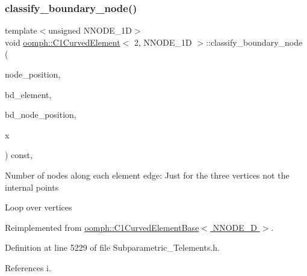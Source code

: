 \subsubsection{\texorpdfstring{classify\+\_\+boundary\+\_\+node()}{classify\_boundary\_node()}}
{\footnotesize\ttfamily template$<$unsigned N\+N\+O\+D\+E\+\_\+1D$>$ \\
void \hyperlink{classoomph_1_1C1CurvedElement}{oomph\+::\+C1\+Curved\+Element}$<$ 2, N\+N\+O\+D\+E\+\_\+1D $>$\+::classify\+\_\+boundary\+\_\+node (\begin{DoxyParamCaption}\item[{\hyperlink{classoomph_1_1DenseMatrix}{Dense\+Matrix}$<$ double $>$ \&}]{node\+\_\+position,  }\item[{unsigned \&}]{bd\+\_\+element,  }\item[{\hyperlink{classoomph_1_1DenseMatrix}{Dense\+Matrix}$<$ double $>$ \&}]{bd\+\_\+node\+\_\+position,  }\item[{\hyperlink{classoomph_1_1Vector}{Vector}$<$ double $>$ \&}]{x }\end{DoxyParamCaption}) const\hspace{0.3cm}{\ttfamily [inline]}, {\ttfamily [virtual]}}

Number of nodes along each element edge\+: Just for the three vertices not the internal points

Loop over vertices 

Reimplemented from \hyperlink{classoomph_1_1C1CurvedElementBase_ada5b9e50a71fd3e9d3975c78b5c3ed52}{oomph\+::\+C1\+Curved\+Element\+Base$<$ N\+N\+O\+D\+E\+\_\+D $>$}.



Definition at line 5229 of file Subparametric\+\_\+\+Telements.\+h.



References i.

\mbox{\label{classoomph_1_1C1CurvedElement_3_012_00_01NNODE__1D_01_4_a878207a94d904e0d954a45de2a626a0e}} 
